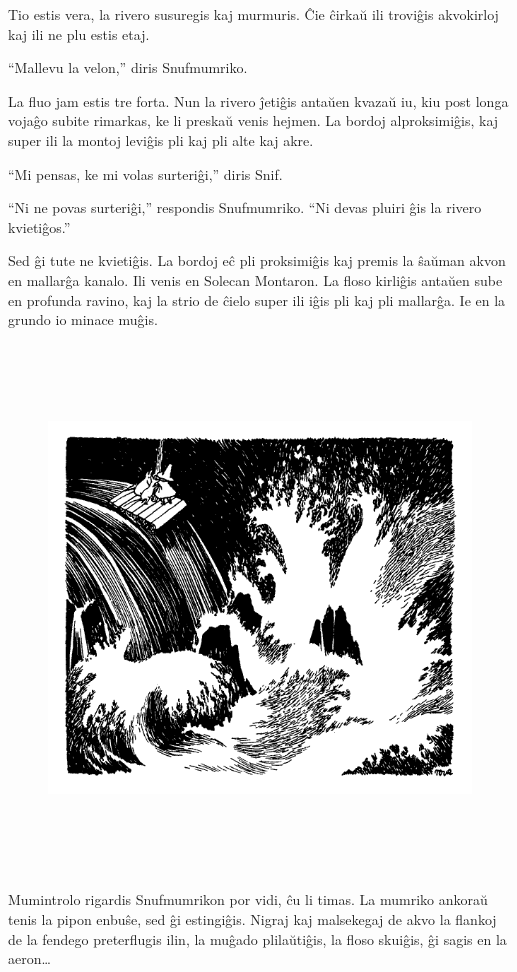 Tio estis vera, la rivero susuregis kaj murmuris. Ĉie ĉirkaŭ ili troviĝis akvokirloj kaj ili ne plu estis etaj.

``Mallevu la velon,'' diris Snufmumriko.

La fluo jam estis tre forta. Nun la rivero ĵetiĝis antaŭen kvazaŭ iu, kiu post longa vojaĝo subite rimarkas, ke li preskaŭ venis hejmen. La bordoj alproksimiĝis, kaj super ili la montoj leviĝis pli kaj pli alte kaj akre.

``Mi pensas, ke mi volas surteriĝi,'' diris Snif.

``Ni ne povas surteriĝi,'' respondis Snufmumriko. ``Ni devas pluiri ĝis la rivero kvietiĝos.''

Sed ĝi tute ne kvietiĝis. La bordoj eĉ pli proksimiĝis kaj premis la ŝaŭman akvon en mallarĝa kanalo. Ili venis en Solecan Montaron. La floso kirliĝis antaŭen sube en profunda ravino, kaj la strio de ĉielo super ili iĝis pli kaj pli mallarĝa. Ie en la grundo io minace muĝis.

\begin{figure}[htbp]
\centering
\includegraphics[width=450pt,height=396pt]{3-10.png}
\caption{}
\label{3-10}
\end{figure}

Mumintrolo rigardis Snufmumrikon por vidi, ĉu li timas. La mumriko ankoraŭ tenis la pipon enbuŝe, sed ĝi estingiĝis. Nigraj kaj malsekegaj de akvo la flankoj de la fendego preterflugis ilin, la muĝado plilaŭtiĝis, la floso skuiĝis, ĝi sagis en la aeron{\ldots}

